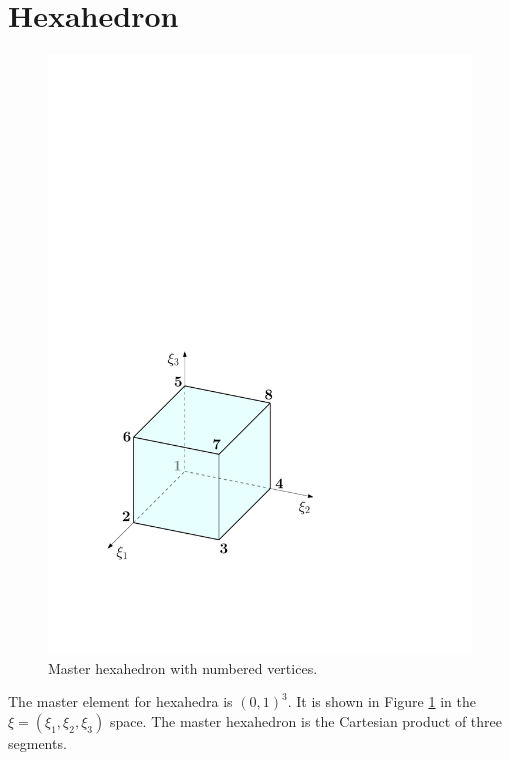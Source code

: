 \section{Hexahedron}
\label{sec:Hexa}

\begin{figure}[!ht]
\begin{center}
\includegraphics[scale=0.5]{./figures/MasterHexa.pdf}
\caption{Master hexahedron with numbered vertices.}
\label{fig:MasterHexa}
\end{center}
\end{figure}

The master element for hexahedra is $(0,1)^3$. 
It is shown in Figure \ref{fig:MasterHexa} in the $\xi=(\xi_1,\xi_2,\xi_3)$ space.
The master hexahedron is the Cartesian product of three segments.


